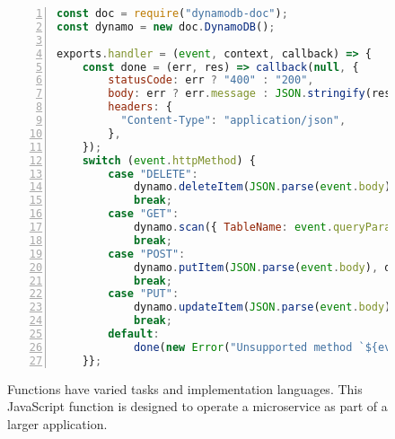\begin{figure}
  \begin{lstlisting}[language=JavaScript, numbers=left, frame=single, basicstyle=\small, columns=fullflexible]
const doc = require("dynamodb-doc");    
const dynamo = new doc.DynamoDB();

exports.handler = (event, context, callback) => {
    const done = (err, res) => callback(null, {
        statusCode: err ? "400" : "200",
        body: err ? err.message : JSON.stringify(res),
        headers: {
          "Content-Type": "application/json",
        },
    });
    switch (event.httpMethod) {
        case "DELETE":
            dynamo.deleteItem(JSON.parse(event.body), done);
            break;
        case "GET":
            dynamo.scan({ TableName: event.queryParams.TableName }, done);
            break;
        case "POST":
            dynamo.putItem(JSON.parse(event.body), done);
            break;
        case "PUT":
            dynamo.updateItem(JSON.parse(event.body), done);
            break;
        default:
            done(new Error("Unsupported method `${event.httpMethod}'"));
    }};
     \end{lstlisting}
     \caption{Functions have varied tasks and implementation languages.
     This JavaScript function is designed to operate a microservice as part of a larger application.}
     \label{fig:javascript-lambda-example}
\end{figure}

\begin{comment}
  \begin{figure}
  \begin{lstlisting}[frame=single, basicstyle=\small, columns=fullflexible]
GET http://faas.com/img_recogn?input_bucket=9bcc64b9.png
  \end{lstlisting}
  \caption{Invoking a serverless function to perform image recognition. Small inputs may be passed directly, with large ones passed indirectly via storage.}
  \label{fig:lambda-invoke}
\end{figure}
\end{comment}

